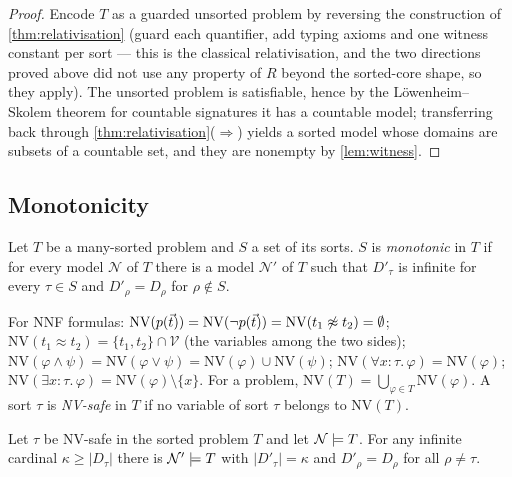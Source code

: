 \begin{proof}
Encode $T$ as a guarded unsorted problem by reversing the
construction of \cref{thm:relativisation} (guard each quantifier,
add typing axioms and one witness constant per sort --- this is the
classical relativisation, and the two directions proved above did
not use any property of $R$ beyond the sorted-core shape, so they
apply).  The unsorted problem is satisfiable, hence by the
L\"owenheim--Skolem theorem for countable signatures
\cite{ChangKeisler1990} it has a countable model; transferring back
through
\cref{thm:relativisation}($\Rightarrow$) yields a sorted model
whose domains are subsets of a countable set, and they are nonempty
by \cref{lem:witness}.
\end{proof}

\subsection{Monotonicity}

\begin{definition}
\label{def:monotonic}
Let $T$ be a many-sorted problem and $S$ a set of its sorts.  $S$
is \emph{monotonic} in $T$ if for every model $\mathcal{N}$ of $T$
there is a model $\mathcal{N}'$ of $T$ such that $D'_\tau$ is
infinite for every $\tau \in S$ and $D'_\rho = D_\rho$ for $\rho
\notin S$.
\end{definition}

\begin{definition}
\label{def:naked}
For NNF formulas: $\mathrm{NV}(p(\vec{t})) =
\mathrm{NV}(\neg p(\vec{t})) = \mathrm{NV}(t_1 \not\approx t_2) =
\emptyset$; $\mathrm{NV}(t_1 \approx t_2) = \{t_1, t_2\} \cap
\mathcal{V}$ (the variables among the two sides);
$\mathrm{NV}(\varphi \wedge \psi) = \mathrm{NV}(\varphi \vee \psi)
= \mathrm{NV}(\varphi) \cup \mathrm{NV}(\psi)$;
$\mathrm{NV}(\forall x{:}\tau.\, \varphi) = \mathrm{NV}(\varphi)$;
$\mathrm{NV}(\exists x{:}\tau.\, \varphi) = \mathrm{NV}(\varphi)
\setminus \{x\}$.  For a problem, $\mathrm{NV}(T) =
\bigcup_{\varphi \in T} \mathrm{NV}(\varphi)$.  A sort $\tau$ is
\emph{NV-safe} in $T$ if no variable of sort $\tau$ belongs to
$\mathrm{NV}(T)$.
\end{definition}

\begin{lemma}
\label{lem:cloning}
Let $\tau$ be NV-safe in the sorted problem $T$ and let
$\mathcal{N} \models T$.  For any infinite cardinal $\kappa \geq
|D_\tau|$ there is $\mathcal{N}' \models T$ with $|D'_\tau| =
\kappa$ and $D'_\rho = D_\rho$ for all $\rho \neq \tau$.
\end{lemma}

